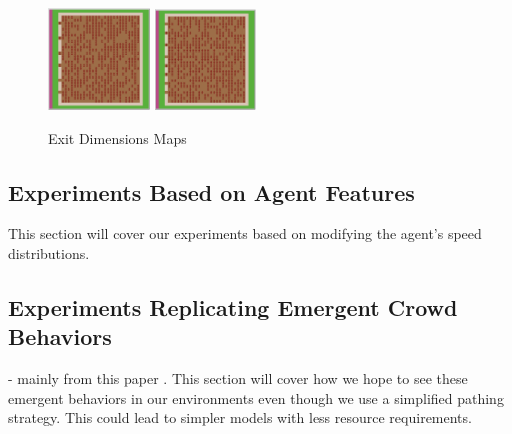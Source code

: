 \documentclass[12pt,letterpaper]{article}
\begin{document}
\begin{figure}[ht]
\begin{minipage}[b]{.75\linewidth}
    \includegraphics[width=0.24\textwidth]{./figures/exit_dims_6_c.png}
    \includegraphics[width=0.24\textwidth]{./figures/exit_dims_8_c.png}
  \end{minipage}

  \caption{Exit Dimensions Maps}
\end{figure}
\subsection{Experiments Based on Agent Features}

This section will cover our experiments based on modifying the agent's speed distributions.


\subsection{Experiments Replicating Emergent Crowd Behaviors} \label{emergentBehavior}
- mainly from this paper \cite{almeidaCrowdSimulationModeling2013}  .  This section will cover how we hope to see these emergent behaviors in our environments even though we use a simplified pathing strategy.  This could lead to simpler models with less resource requirements.
\end{document}
